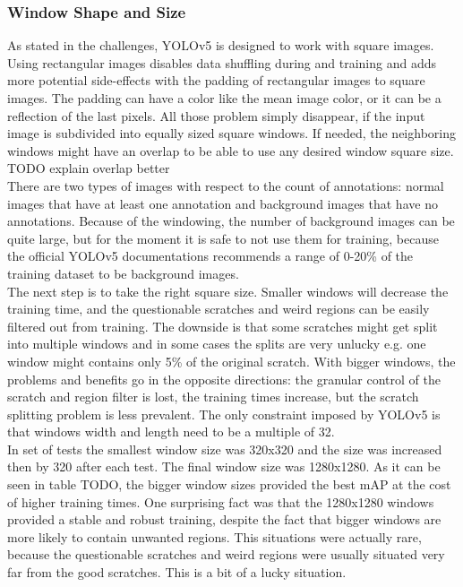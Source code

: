 \subsubsection{Window Shape and Size}
As stated in the challenges, YOLOv5 is designed to work with square images. Using rectangular images disables data shuffling during and training and adds more potential side-effects with the padding of rectangular images to square images. The padding can have a color like the mean image color, or it can be a reflection of the last pixels. All those problem simply disappear, if the input image is subdivided into equally sized square windows. If needed, the neighboring windows might have an overlap to be able to use any desired window square size. TODO explain overlap better \\
There are two types of images with respect to the count of annotations: normal images that have at least one annotation and background images that have no annotations. Because of the windowing, the number of background images can be quite large, but for the moment it is safe to not use them for training, because the official YOLOv5 documentations recommends a range of 0-20\% of the training dataset to be background images. \\
The next step is to take the right square size. Smaller windows will decrease the training time, and the questionable scratches and weird regions can be easily filtered out from training. The downside is that some scratches might get split into multiple windows and in some cases the splits are very unlucky e.g. one window might contains only 5\% of the original scratch. With bigger windows, the problems and benefits go in the opposite directions: the granular control of the scratch and region filter is lost, the training times increase, but the scratch splitting problem is less prevalent. The only constraint imposed by YOLOv5 is that windows width and length need to be a multiple of 32.\\
In set of tests the smallest window size was 320x320 and the size was increased then by 320 after each test. The final window size was 1280x1280. As it can be seen in table TODO, the bigger window sizes provided the best mAP at the cost of higher training times. One surprising fact was that the 1280x1280 windows provided a stable and robust training, despite the fact that bigger windows are more likely to contain unwanted regions. This situations were actually rare, because the questionable scratches and weird regions were usually situated very far from the good scratches. This is a bit of a lucky situation. \\
